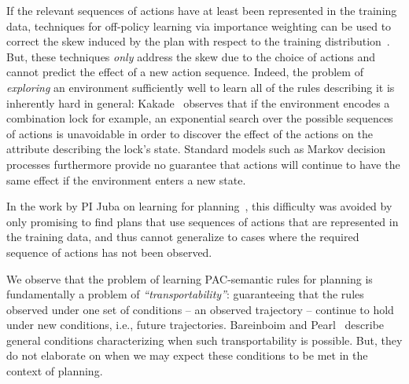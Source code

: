 \documentclass[12pt]{article}
\begin{document}
If the relevant sequences of actions have at least been represented in the training data, techniques for off-policy learning via importance weighting can be used to correct the skew induced by the plan with respect to the training distribution~\cite{precup2000off-policy,precup2001off-policy,shelton2001,peshkin2001,peshkin2002,uchibe2004,wawrzynski2009,hachiya2009,hachiya2011,juba2016jmlr}. But, these techniques {\em only} address the skew due to the choice of actions and cannot predict the effect of a new action sequence. Indeed, the problem of {\em exploring} an environment sufficiently well to learn all of the rules describing it is inherently hard in general: Kakade~\cite[Section~8.6]{kakade2003thesis} observes that if the environment encodes a combination lock for example, an exponential search over the possible sequences of actions is unavoidable in order to discover the effect of the actions on the attribute describing the lock's state. Standard models such as Markov decision processes furthermore provide no guarantee that actions will continue to have the same effect if the environment enters a new state. 

In the work by PI Juba on learning for planning~\cite{juba2016jmlr}, this difficulty was avoided by only promising to find plans that use sequences of actions that are represented in the training data, and thus cannot generalize to cases where the required sequence of actions has not been observed. %

We observe that the problem of learning PAC-semantic rules for planning is fundamentally a problem of {\em ``transportability''}: guaranteeing that the rules observed under one set of conditions -- an observed trajectory -- continue to hold under new conditions, i.e., future trajectories. Bareinboim and Pearl~\cite{bareinboim2012completeness,bareinboim2013algorithm} describe general conditions characterizing when such transportability is possible. %
But, they do not elaborate on when we may expect these conditions to be met in the context of planning.
\end{document}
